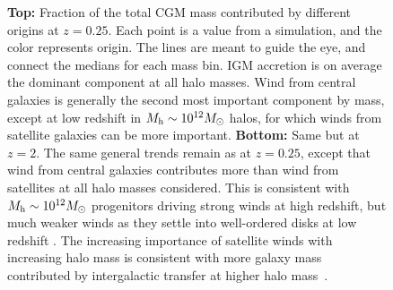 \documentclass[fleqn,usenatbib]{mnras}
\begin{document}
\begin{figure}
\caption{
\textbf{Top:}
Fraction of the total CGM mass contributed by different origins at $z=0.25$.
Each point is a value from a simulation, and the color represents origin.
The lines are meant to guide the eye, and connect the medians for each mass bin.
IGM accretion is on average the dominant component at all halo masses.
Wind from central galaxies is generally the second most important component by mass, except at low redshift in $M_{\rm h}\sim 10^{12} M_{\odot}$ halos, for which winds from satellite galaxies can be more important. 
\textbf{Bottom:}
Same but at $z=2$.
The same general trends remain as at $z=0.25$, except that wind from central galaxies contributes more than wind from satellites at all halo masses considered. 
This is consistent with $M_{\rm h}\sim 10^{12} M_{\odot}$  progenitors driving strong winds at high redshift, but much weaker winds as they settle into well-ordered disks at low redshift \citep[e.g.][]{Muratov2015}. 
The increasing importance of satellite winds with increasing halo mass is consistent with more galaxy mass contributed by intergalactic transfer at higher halo mass~\citep[][]{Angles-Alcazar2017}.
}
\label{fig:CGM_mass_frac_vs_Mh_CGM}
\end{figure}
\end{document}

